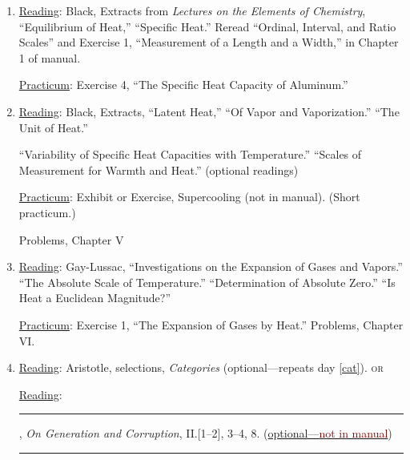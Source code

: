 \documentclass{article}
\newcommand{\rd}{\uline{Reading}}
\newcommand{\pc}{\uline{Practicum}}
\begin{document}
\begin{enumerate}
	\pc: Exercise 1, ``The Unmarked Mercury Thermometer.'' Exercise 2, ``The Celsius Scale.'' Exercise 3, ``The Temperature of a Mixture.''

\item \rd: Black, Extracts from \emph{Lectures on the Elements of Chemistry}, ``Equilibrium of Heat,'' ``Specific Heat.'' Reread ``Ordinal, Interval, and Ratio Scales'' and Exercise 1,
``Measurement of a Length and a Width,'' in Chapter 1 of manual. 

	\pc: Exercise 4, ``The Specific Heat Capacity of Aluminum.''

\item \rd: Black, Extracts, ``Latent Heat,'' ``Of Vapor and Vaporization.'' ``The Unit of Heat.'' 

``Variability of Specific Heat Capacities with
Temperature.'' ``Scales of Measurement for Warmth and Heat.'' (optional readings)

	\pc: Exhibit or Exercise,  Supercooling (not in manual). (Short practicum.) 
	
	Problems, Chapter V

\item \rd: Gay-Lussac, ``Investigations on the Expansion of Gases
and Vapors.'' ``The Absolute Scale of Temperature.'' ``Determination of Absolute Zero.'' ``Is
Heat a Euclidean Magnitude?''

\pc: Exercise 1, ``The Expansion of Gases by Heat.'' Problems, Chapter VI.

\item \rd: Aristotle, selections, \emph{Categories} (optional---repeats day \ref{cat}). \textsc{or}

\rd: \rule[0ex]{8mm}{0.5pt}, \emph{On Generation and Corruption}, II.[1--2], 3--4, 8. (\href{https://sjca.sharepoint.com/:b:/r/sites/Departments/Faculty/Documents/Annapolis/Freshman\%20Lab/Schedule\%20and\%20files/Arist_Gen_Corrup.pdf?csf=1&web=1&e=3vRrTS}{optional---\textcolor{Maroon}{not in manual}}) \rule{1.2ex}{1.2ex}
\end{enumerate}

\newpage

\thispagestyle{plain}
\pagestyle{fancy}
\fancyhead{}



\end{document}
